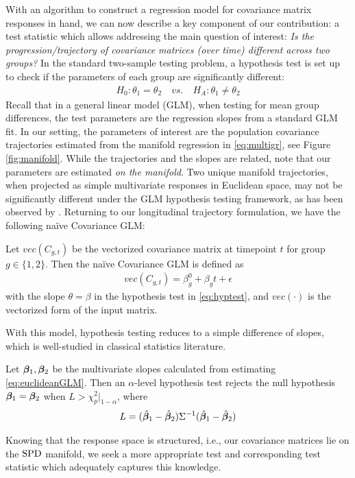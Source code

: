 With an algorithm to construct a regression model for covariance matrix responses in hand, we can now describe a key
component of our contribution: a test statistic which allows addressing the main question of interest: 
{\em Is the progression/trajectory of covariance matrices (over time) different across two groups?} In the standard two-sample testing problem, a hypothesis test is set up
to check if the parameters of each group are significantly different:
\begin{align}\label{eq:hyptest}
H_0: \theta_1 = \theta_2 \quad vs. \quad H_A: \theta_1 \neq \theta_2
\end{align}
Recall that in a general linear model (GLM), when testing for mean group differences, the test parameters are the regression slopes from a standard GLM fit. 
In our setting, the parameters of interest are the population covariance trajectories estimated from the manifold regression in \eqref{eq:multigr}, see Figure \ref{fig:manifold}. 
While the trajectories and the slopes are related, note that our parameters are estimated {\em on the manifold}. 
Two unique manifold trajectories, when projected as simple multivariate responses in Euclidean space, may not be significantly different under the GLM hypothesis testing framework, as has been observed by \cite{du2014geodesic}. Returning to our longitudinal trajectory formulation, we have the following na\"ive Covariance GLM:
\begin{definition} Let $vec(C_{g,t})$ be the vectorized covariance matrix at timepoint $t$ for group $g \in \{1,2\}$. Then the 
na\"ive Covariance GLM is defined as
\begin{align}\label{eq:euclideanGLM}
vec(C_{g,t}) = \beta_g^{0} + \beta_g t + \epsilon
\end{align}
with the slope $\theta = \beta$ in the hypothesis test in \eqref{eq:hyptest}, and $vec(\cdot)$ is the vectorized form of the input matrix. 
\end{definition}
With this model, hypothesis testing reduces to a simple difference of slopes, which is well-studied in classical statistics literature.
\begin{definition}\citep{seber2003linear}\label{def:euclideanhyptest}
Let $\bm{\beta}_1,\bm{\beta}_2$ be the multivariate slopes calculated from estimating \eqref{eq:euclideanGLM}.
Then an $\alpha$-level hypothesis test rejects the null hypothesis $\bm{\beta}_1 = \bm{\beta}_2$ when $L > \chi^2_{p}|_{1-\alpha}$, where
\begin{align}\label{eq:euclideanhyptest}
L = (\hat{\bm{\beta}}_1 - \hat{\bm{\beta}}_2)\Sigma^{-1}(\hat{\bm{\beta}}_1 - \hat{\bm{\beta}}_2)
\end{align}
\end{definition}
Knowing that the response space is structured, i.e., our covariance matrices lie on the $\text{SPD}$ manifold, we seek a more appropriate test and corresponding test statistic which 
adequately captures this knowledge. 

